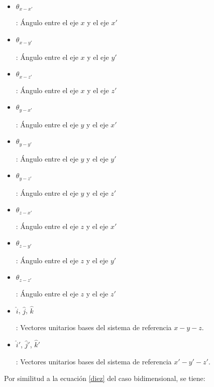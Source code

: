 \documentclass[12pt,letterpaper, twoside, openany]{article}
\begin{document}
%
%
%
%
%

%
\begin{itemize}
	\item \begin{large}$\theta_{x-x'}$\end{large}: Ángulo entre el eje $x$ y el eje $x'$
	\item \begin{large}$\theta_{x-y'}$\end{large}: Ángulo entre el eje $x$ y el eje $y'$
	\item \begin{large}$\theta_{x-z'}$\end{large}: Ángulo entre el eje $x$ y el eje $z'$
	\item \begin{large}$\theta_{y-x'}$\end{large}: Ángulo entre el eje $y$ y el eje $x'$
	\item \begin{large}$\theta_{y-y'}$\end{large}: Ángulo entre el eje $y$ y el eje $y'$
	\item \begin{large}$\theta_{y-z'}$\end{large}: Ángulo entre el eje $y$ y el eje $z'$
	\item \begin{large}$\theta_{z-x'}$\end{large}: Ángulo entre el eje $z$ y el eje $x'$
	\item \begin{large}$\theta_{z-y'}$\end{large}: Ángulo entre el eje $z$ y el eje $y'$
	\item \begin{large}$\theta_{z-z'}$\end{large}: Ángulo entre el eje $z$ y el eje $z'$
	\item \begin{large}$\hat{i}$, $\hat{j}$, $\hat{k}$\end{large}: Vectores unitarios bases del sistema de referencia $x-y-z$.
	\item \begin{large}$\hat{i}'$, $\hat{j}'$, $\hat{k}'$\end{large}: Vectores unitarios bases del sistema de referencia $x'-y'-z'$.
\end{itemize}
%
Por similitud a la ecuación \ref{diez} del caso bidimensional, se tiene: 
%
\end{document}
